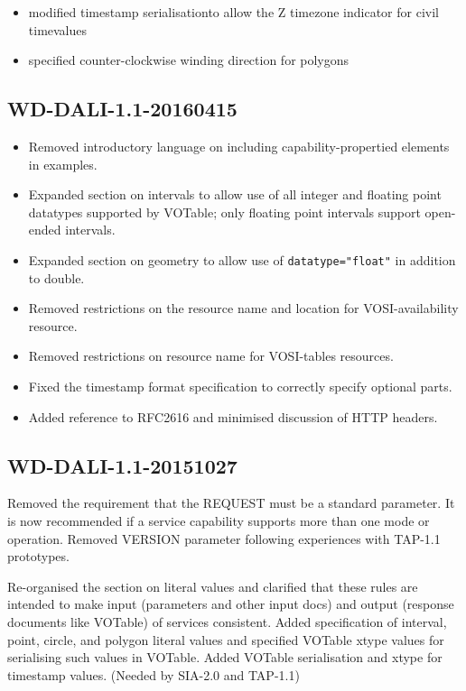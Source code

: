 \documentclass[11pt,letter]{ivoa}
\begin{document}
\begin{itemize}
\item modified timestamp serialisationto allow the Z timezone indicator for 
civil timevalues
\item specified counter-clockwise winding direction for polygons
\end{itemize}

\subsection{WD-DALI-1.1-20160415}

\begin{itemize}
\item Removed introductory language on including capability-propertied elements in
examples.
\item Expanded section on intervals to allow use of all integer and floating point datatypes 
supported by VOTable; only floating point intervals support open-ended intervals.
\item Expanded section on geometry to allow use of \verb|datatype="float"| in addition to double.
\item Removed restrictions on the resource name and location for VOSI-availability resource.
\item Removed restrictions on resource name for VOSI-tables resources.
\item Fixed the timestamp format specification to correctly specify optional parts.
\item Added reference to RFC2616 and minimised discussion of HTTP headers.
\end{itemize}

\subsection{WD-DALI-1.1-20151027}

Removed the requirement that the REQUEST must be a standard parameter. It is 
now recommended if a service capability supports more than one mode or 
operation. Removed VERSION parameter following experiences with TAP-1.1 
prototypes.

Re-organised the section on literal values and clarified that these rules 
are intended to make input (parameters and other input docs) and output 
(response documents like VOTable) of services consistent. Added specification 
of interval, point, circle, and polygon literal values and specified VOTable 
xtype values for serialising such values in VOTable. Added VOTable serialisation 
and xtype for timestamp values. (Needed by SIA-2.0 and TAP-1.1)
\end{document}

